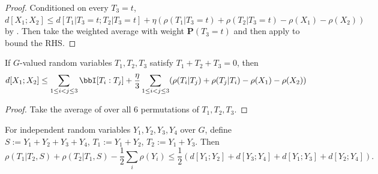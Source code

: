\begin{proof}\leanok
  Conditioned on every $T_3=t$, $d[X_1;X_2]\le d[T_1|T_3=t;T_2|T_3=t]+\eta(\rho(T_1|T_3=t)+\rho(T_2|T_3=t)-\rho(X_1)-\rho(X_2))$ by . Then take the weighted average with weight $\mathbf{P}(T_3=t)$ and then apply  to bound the RHS.
\end{proof}

\begin{lemma}\label{rho-BSG-triplet-symmetrized}\leanok
  If $G$-valued random variables $T_1,T_2,T_3$ satisfy $T_1+T_2+T_3=0$, then
  $$d[X_1;X_2] \leq  \sum_{1 \leq i<j \leq 3} \bbI[T_i:T_j] + \frac{\eta}{3}   \sum_{1 \leq i<j \leq 3} (\rho(T_i|T_j) + \rho(T_j|T_i) -\rho(X_1)-\rho(X_2))$$
\end{lemma}

\begin{proof}\leanok
  Take the average of  over all $6$ permutations of $T_1,T_2,T_3$.
\end{proof}


\begin{lemma}\label{rho-increase}\leanok
  For independent random variables $Y_1,Y_2,Y_3,Y_4$ over $G$, define $S:=Y_1+Y_2+Y_3+Y_4$, $T_1:=Y_1+Y_2$, $T_2:=Y_1+Y_3$. Then
  $$\rho(T_1|T_2,S)+\rho(T_2|T_1,S) - \frac{1}{2}\sum_{i} \rho(Y_i)\le \frac{1}{2}(d[Y_1;Y_2]+d[Y_3;Y_4]+d[Y_1;Y_3]+d[Y_2;Y_4]).$$
\end{lemma}

